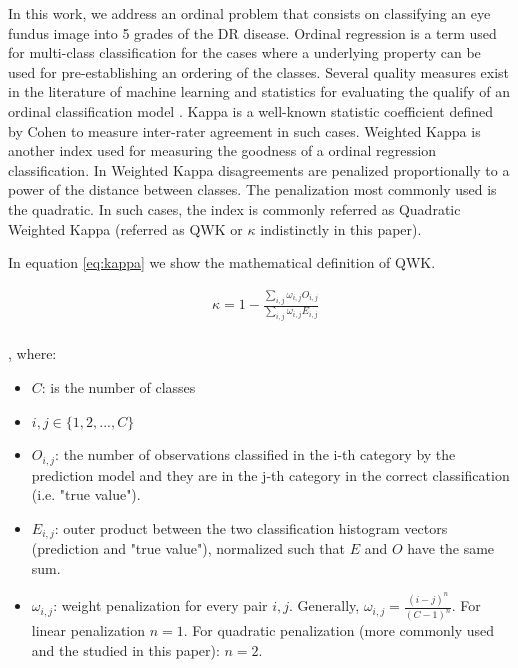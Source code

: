 \documentclass[review]{elsarticle}
\theoremstyle{definition} %
\theoremstyle{remark}
\begin{document}
In this work, we address an ordinal problem that consists on classifying an eye fundus image into 5 grades of the DR disease. 
Ordinal regression is a term used for multi-class classification for the cases where a underlying property can be used for pre-establishing an ordering of the classes. Several quality measures exist in the literature of machine learning and statistics for evaluating the qualify of an ordinal classification model \citep{mehdiyev2016evaluating}. Kappa is a well-known statistic coefficient defined by Cohen \citep{cohen1960coefficient} to measure inter-rater agreement in such cases. Weighted Kappa \citep{cohen1968weighted} is another index used for measuring the goodness of a ordinal regression classification. In Weighted Kappa disagreements are penalized proportionally to a power of the distance between classes. The penalization most commonly used is the quadratic. In such cases, the index is commonly referred as Quadratic Weighted Kappa (referred as QWK or $\kappa$ indistinctly in this paper). 

In equation \ref{eq:kappa} we show the mathematical definition of QWK.

\begin{equation}
\label{eq:kappa}
\begin{aligned}
&\kappa = 1 - \frac{ \sum_{i,j} \omega_{i,j} O_{i,j} }
{\sum_{i,j} \omega_{i,j} E_{i,j}}\\
\end{aligned}
\end{equation}

, where:
\begin{itemize}
	\item[] $C$: is the number of classes
	\item[] $i, j \in \{ 1, 2, ..., C\}$
	\item[] $O_{i,j}$: the number of observations classified in the i-th category by the prediction model and they are in the j-th category in the correct classification (i.e. "true value").
	\item[] $E_{i,j}$: outer product between the two classification histogram vectors (prediction and "true value"), normalized such that $E$ and $O$ have the same sum.
	\item[] $\omega_{i,j}$: weight penalization for every pair $i,j$. Generally, $\omega_{i,j} = \frac{(i-j)^n}{(C - 1)^n}$. For linear penalization $n = 1$. For quadratic penalization (more commonly used and the studied in this paper): $n = 2$.
\end{itemize}
\end{document}

